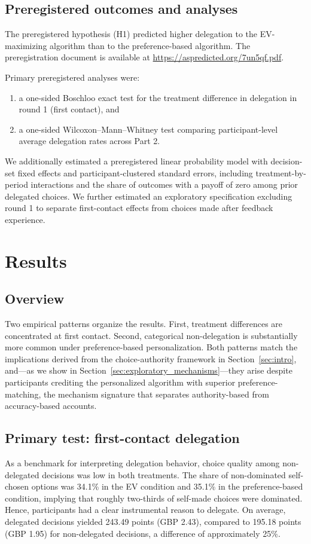 \documentclass[a4paper, 12pt, fleqn]{article}
\theoremstyle{definition}
\newcommand{\inew}[1]{{\color{blue} #1\color{black}}}
\begin{document}
\subsection{Preregistered outcomes and analyses}
The preregistered hypothesis (H1) predicted higher delegation to the EV-maximizing algorithm than to the preference-based algorithm.
The preregistration document is available at {\footnotesize\url{https://aspredicted.org/7un5qf.pdf}}.

Primary preregistered analyses were:
\begin{enumerate}
  \item a one-sided Boschloo exact test for the treatment difference in delegation in round 1 (first contact), and
  \item a one-sided Wilcoxon--Mann--Whitney test comparing participant-level average delegation rates across Part 2.
\end{enumerate}

We additionally estimated a preregistered linear probability model with decision-set fixed effects and participant-clustered standard errors, including treatment-by-period interactions and the share of outcomes with a payoff of zero among prior delegated choices. We further estimated an exploratory specification excluding round 1 to separate first-contact effects from choices made after feedback experience.

\section{Results}
\label{sec:results}

\subsection{Overview}
Two empirical patterns organize the results. First, treatment differences are concentrated at first contact. Second, categorical non-delegation is substantially more common under preference-based personalization. \inew{Both patterns match the implications derived from the choice-authority framework in Section~\ref{sec:intro}, and---as we show in Section~\ref{sec:exploratory_mechanisms}---they arise despite participants crediting the personalized algorithm with superior preference-matching, the mechanism signature that separates authority-based from accuracy-based accounts.}

\subsection{Primary test: first-contact delegation}
As a benchmark for interpreting delegation behavior, choice quality among non-delegated decisions was low in both treatments. The share of non-dominated self-chosen options was 34.1\% in the EV condition and 35.1\% in the preference-based condition, implying that roughly two-thirds of self-made choices were dominated. Hence, participants had a clear instrumental reason to delegate. On average, delegated decisions yielded 243.49 points (GBP 2.43), compared to 195.18 points (GBP 1.95) for non-delegated decisions, a difference of approximately 25\%.
\end{document}
